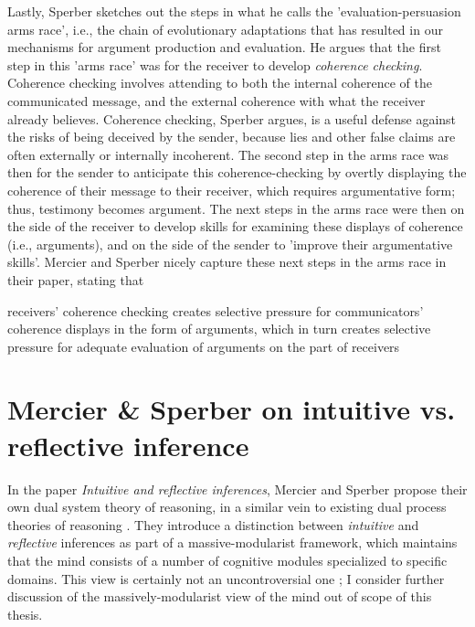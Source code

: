 Lastly, Sperber sketches out the steps in what he calls the 'evaluation-persuasion arms race', i.e., the chain of evolutionary adaptations that has resulted in our mechanisms for argument production and evaluation.
He argues that the first step in this 'arms race' was for the receiver to develop \emph{coherence checking}. Coherence checking involves attending to both the internal coherence of the communicated message, and the external coherence with what the receiver already believes. Coherence checking, Sperber argues, is a useful defense against the risks of being deceived by the sender, because lies and other false claims are often externally or internally incoherent.
The second step in the arms race was then for the sender to anticipate this coherence-checking by overtly displaying the coherence of their message to their receiver, which requires argumentative form; thus, testimony becomes argument.
The next steps in the arms race were then on the side of the receiver to develop skills for examining these displays of coherence (i.e., arguments), and on the side of the sender to 'improve their argumentative skills'.
Mercier and Sperber nicely capture these next steps in the arms race in their \citeyear{MS11} paper, stating that
\begin{quoting}
    receivers' coherence checking creates selective pressure for communicators' coherence displays in the form of arguments, which in turn creates selective pressure for adequate evaluation of arguments on the part of receivers
\end{quoting}

\section{Mercier \& Sperber on intuitive vs. reflective inference}
\label{sec:MS09}

In the \citeyear{MS09} paper \emph{Intuitive and reflective inferences}, Mercier and Sperber propose their own dual system theory of reasoning, in a similar vein to existing dual process theories of reasoning \citep{Sloman96, Evans03, Evans13, Kahneman11}.
They introduce a distinction between \emph{intuitive} and \emph{reflective} inferences as part of a massive-modularist framework, which maintains that the mind consists of a number of cognitive modules specialized to specific domains.
This view is certainly not an uncontroversial one \citep[cf.][\S 3.1]{Novaes18}; I consider further discussion of the massively-modularist view of the mind out of scope of this thesis.

